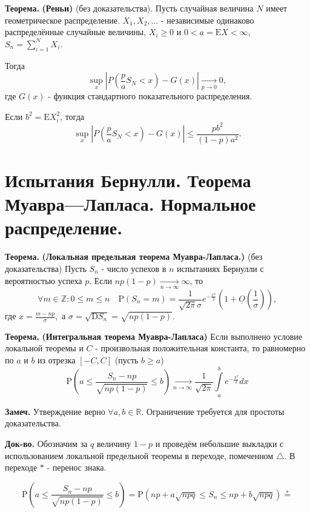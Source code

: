 \documentclass[oneside,final,14pt]{extreport}
\newcommand\mynote{{\bf Замеч.}}
\newcommand\myth{{\bf Теорема.}}
\newcommand\myqed{{\bf Док-во.}}
\theoremstyle{definition}
\begin{document}
\myth{} \textbf{(Реньи)} (без доказательства). Пусть случайная величина $N$ имеет геометрическое распределение. $X_1, X_2, ...$ - независимые одинаково распределённые случайные величины, $X_i \geqslant 0$ и $0 < a = \mathrm{E}X < \infty$, $S_n = \sum\limits_{i=1}^N X_i.$

Тогда $$\sup _{x}\left|P\left(\frac{p}{a} S_{N}<x\right)-G(x)\right| \underset{p \rightarrow 0}{\longrightarrow} 0,$$
где $G(x)$ - функция стандартного показательного распределения.

Если $b^2 = \mathrm{E}X_i^2$, тогда $$\sup_{x}\left|P\left(\frac{p}{a} S_{N}<x\right)-G(x)\right| \leqslant \frac{p b^{2}}{(1-p) a^{2}}.$$
 
\section{Испытания Бернулли. Теорема Муавра—Лапласа. Нормальное распределение.}

\myth{} \textbf{(Локальная предельная теорема Муавра-Лапласа.)} (без доказательства) Пусть $S_n$ - число успехов в $n$ испытаниях Бернулли с вероятностью успеха $p$. Если $n p(1-p) \underset{n \rightarrow \infty}{\longrightarrow} \infty$, то
$$\forall m \in \mathbb{Z}: 0 \leqslant m \leqslant n \quad \mathrm{P}\left(S_{n}=m\right)=\frac{1}{\sqrt{2 \pi} \sigma} e^{-\frac{x^{2}}{2}}\left(1+\underline{O}\left(\frac{1}{\sigma}\right)\right),$$
где $x = \frac{m - np}{\sigma},$ а $\sigma=\sqrt{\mathrm{D} S_{n}}=\sqrt{n p(1-p)}$.

\myth{} \textbf{(Интегральная теорема Муавра-Лапласа)} Если выполнено условие локальной теоремы и $C$ - произвольная положительная константа, то равномерно по $a$ и $b$ из отрезка $[-C,C]$ (пусть $b \geqslant a$)
$$\mathrm{P}\left(a \leqslant \frac{S_{n}-n p}{\sqrt{n p(1-p)}} \leqslant b\right) \underset{n \rightarrow \infty}{\longrightarrow} \frac{1}{\sqrt{2 \pi}} \int\limits_{a}^{b} e^{-\frac{x^{2}}{2}} d x$$

\mynote{} Утверждение верно $\forall a,b \in \mathbb{R}$. Ограничение требуется для простоты доказательства.

\myqed{} Обозначим за $q$ величину $1 - p$ и проведём небольшие выкладки с использованием локальной предельной теоремы в переходе, помеченном $\triangle$. В переходе $*$ - перенос знака.

$$\mathrm{P}\left(a \leqslant \frac{S_{n}-n p}{\sqrt{n p(1-p)}} \leqslant b\right)=\mathrm{P}\left(n p+a \sqrt{n p q} \leqslant S_{n} \leqslant n p+b \sqrt{n p q}\right) \stackrel{*}{=}$$
\end{document}
